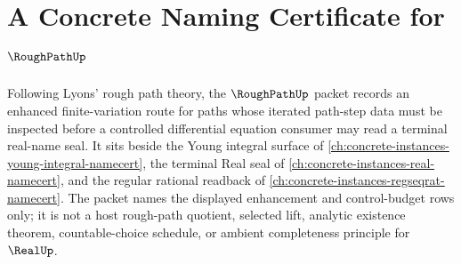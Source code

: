 \chapter{A Concrete Naming Certificate for $\RoughPathUp$}
\label{ch:concrete-instances-rough-path-namecert}

Following Lyons' rough path theory, the $\RoughPathUp$ packet records an enhanced finite-variation route for paths whose iterated path-step data must be inspected before a controlled differential equation consumer may read a terminal real-name seal. It sits beside the Young integral surface of \autoref{ch:concrete-instances-young-integral-namecert}, the terminal Real seal of \autoref{ch:concrete-instances-real-namecert}, and the regular rational readback of \autoref{ch:concrete-instances-regseqrat-namecert}. The packet names the displayed enhancement and control-budget rows only; it is not a host rough-path quotient, selected lift, analytic existence theorem, countable-choice schedule, or ambient completeness principle for $\RealUp$.

